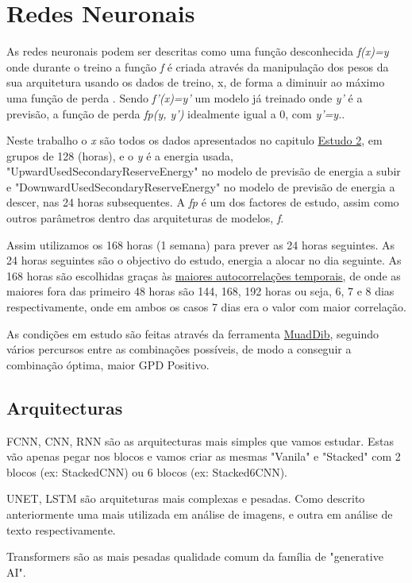 \section{Redes Neuronais}

As redes neuronais podem ser descritas como uma função desconhecida \textit{f(x)=y} onde durante o treino a função \textit{f} é criada através da manipulação dos pesos da sua arquitetura usando os dados de treino, x, de forma a diminuir ao máximo uma função de perda . Sendo \textit{f'(x)=y'} um modelo já treinado onde \textit{y'} é a previsão, a função de perda \textit{fp(y, y')} idealmente igual a 0, com \textit{y'=y.}.\par
Neste trabalho o \textit{x} são todos os dados apresentados no capitulo \hyperref[ch:estudo_2]{Estudo 2}, em grupos de 128 (horas), e o \textit{y} é a energia usada, "UpwardUsedSecondaryReserveEnergy" no modelo de previsão de energia a subir e "DownwardUsedSecondaryReserveEnergy" no modelo de previsão de energia a descer, nas 24 horas subsequentes. A \textit{fp} é um dos factores de estudo, assim como outros parâmetros dentro das arquiteturas de modelos, \textit{f}.\par
Assim utilizamos os 168 horas (1 semana) para prever as 24 horas seguintes. As 24 horas seguintes são o objectivo do estudo, energia a alocar no dia seguinte. As 168 horas são escolhidas graças às \hyperref[tab:tempcorr]{maiores autocorrelações temporais}, de onde as maiores fora das primeiro 48 horas são 144, 168, 192 horas ou seja, 6, 7 e 8 dias respectivamente, onde em ambos os casos 7 dias era o valor com maior correlação.\par
As condições em estudo são feitas através da ferramenta \hyperref[se:muaddib]{MuadDib}, seguindo vários percursos entre as combinações possíveis, de modo a conseguir a combinação óptima, maior GPD Positivo.\par


\subsection{Arquitecturas}

\gls{FCNN}, \gls{CNN}, RNN são as arquitecturas mais simples que vamos estudar. Estas vão apenas pegar nos blocos e vamos criar as mesmas "Vanila" e "Stacked" com 2 blocos (ex: StackedCNN) ou 6 blocos (ex: Stacked6CNN).\par
UNET, \gls{LSTM} são arquiteturas mais complexas e pesadas. Como descrito anteriormente uma mais utilizada em análise de imagens, e outra em análise de texto respectivamente.\par
Transformers são as mais pesadas qualidade comum da família de "generative AI".

